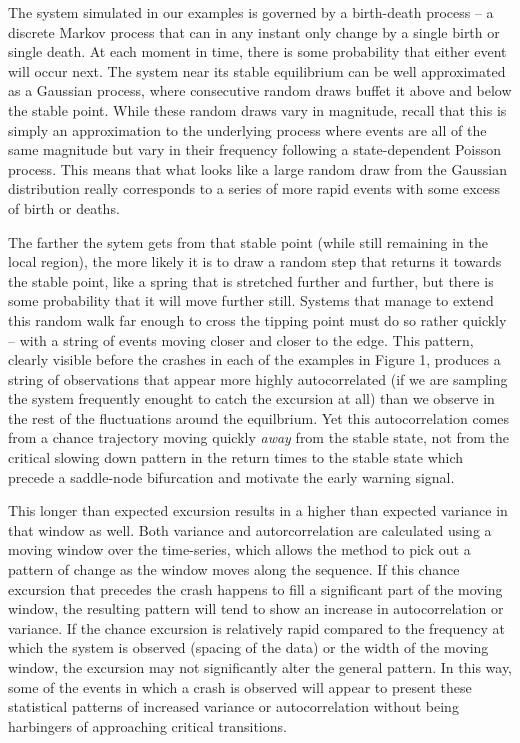 \documentclass[authoryear,review,12pt]{elsarticle}
\begin{document}
The system simulated in our examples is governed by a birth-death process --
a discrete Markov process that can in any instant only change by a single 
birth or single death.  At each moment in time, there is some probability 
that either event will occur next.  The system near its stable equilibrium
can be well approximated as a Gaussian process, where consecutive random 
draws buffet it above and below the stable point. While these random draws
vary in magnitude, recall that this is simply an approximation to the 
underlying process where events are all of the same magnitude but vary
in their frequency following a state-dependent Poisson process.  This 
means that what looks like a large random draw from the Gaussian distribution
really corresponds to a series of more rapid events with some excess of 
birth or deaths.  

The farther the sytem gets from that stable point (while still 
remaining in the local region), the more likely it is to draw a random step 
that returns it towards the stable point, like a spring that is stretched 
further and further, but there is some probability that it will move further
still. Systems that manage to extend this random walk far enough to cross the
tipping point must do so rather quickly -- with a string of events moving 
closer and closer to the edge.  This pattern, clearly visible before the 
crashes in each of the examples in Figure 1, produces a string of observations
that appear more highly autocorrelated (if we are sampling the system
frequently enought to catch the excursion at all) than we observe in the rest
of the fluctuations around the equilbrium.  Yet this autocorrelation comes from
a chance trajectory moving quickly \emph{away} from the stable state, not from
the critical slowing down pattern in the return times to the stable state
which precede a saddle-node bifurcation and motivate the early warning signal.



This longer than expected excursion results in a higher than expected variance
in that window as well. Both variance and autorcorrelation are calculated using
a moving window over the time-series, which allows the method to pick out a 
pattern of change as the window moves along the sequence. If this chance excursion 
that precedes the crash happens to fill a significant part of the moving window,
the resulting pattern will tend to show an increase in autocorrelation or variance.
If the chance excursion is relatively rapid compared to the frequency at which
the system is observed (spacing of the data) or the width of the moving window, 
the excursion may not significantly alter the general pattern.  In this way, 
some of the events in which a crash is observed will appear to present these
statistical patterns of increased variance or autocorrelation without being
harbingers of approaching critical transitions.  
\end{document}
